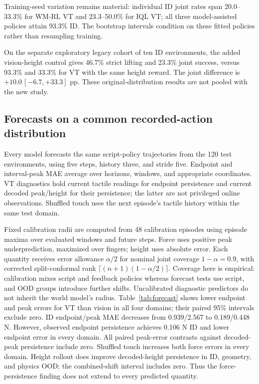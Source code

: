 \documentclass[letterpaper,10pt,conference]{ieeeconf}
\begin{document}
Training-seed variation remains material: individual ID joint rates span 20.0--33.3\% for WM-RL VT and 23.3--50.0\% for IQL VT; all three model-assisted policies attain 93.3\% ID. The bootstrap intervals condition on these fitted policies rather than resampling training.


On the separate exploratory legacy cohort of ten ID environments, the added vision-height control gives 46.7\% strict lifting and 23.3\% joint success, versus 93.3\% and 33.3\% for VT with the same height reward. The joint difference is \mbox{$+10.0\,[-6.7,+33.3]$} pp. These original-distribution results are not pooled with the new study.

\subsection{Forecasts on a common recorded-action distribution}
Every model forecasts the same script-policy trajectories from the 120
test environments, using five steps, history three, and stride five.
Endpoint and interval-peak MAE average over horizons, windows, and
appropriate coordinates. VT diagnostics hold current tactile readings for
endpoint persistence and current decoded peak/height for their persistence;
the latter are not privileged online observations. Shuffled touch uses the
next episode's tactile history within the same test domain.

Fixed calibration radii are computed from 48 calibration episodes using
episode maxima over evaluated windows and future steps. Force uses
positive peak underprediction, maximized over fingers; height uses absolute
error. Each quantity receives error allowance $\alpha/2$ for nominal
joint coverage $1-\alpha=0.9$, with corrected split-conformal rank
$\lceil(n+1)(1-\alpha/2)\rceil$. Coverage here is empirical: calibration
mixes script and feedback policies whereas forecast tests use script,
and OOD groups introduce further shifts. Uncalibrated diagnostic
predictors do not inherit the world model's radius.
Table~\ref{tab:forecast} shows lower endpoint and peak errors for VT than vision in all four domains; their paired 95\% intervals exclude zero. ID endpoint/peak MAE decreases from 0.939/2.567 to 0.189/0.448 N. However, observed endpoint persistence achieves 0.106 N ID and lower endpoint error in every domain. All paired peak-error contrasts against decoded-peak persistence include zero. Shuffled touch increases both force errors in every domain. Height rollout does improve decoded-height persistence in ID, geometry, and physics OOD; the combined-shift interval includes zero. Thus the force-persistence finding does not extend to every predicted quantity.
\end{document}
